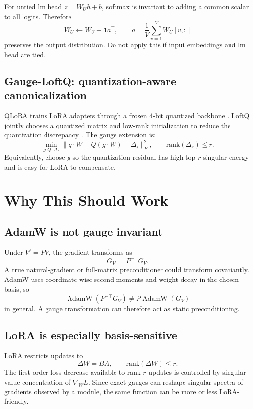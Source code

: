 \documentclass[11pt]{article}
\newcommand{\rank}{\mathrm{rank}}
\begin{document}
For untied lm head $z=W_Uh+b$, softmax is invariant to adding a common scalar to all logits. Therefore
\[
    W_U\leftarrow W_U-\mathbf 1 a^\top,
    \qquad
    a=\frac{1}{V}\sum_{v=1}^V W_U[v,:]
\]
preserves the output distribution. Do not apply this if input embeddings and lm head are tied.

\subsection{Gauge-LoftQ: quantization-aware canonicalization}

QLoRA trains LoRA adapters through a frozen 4-bit quantized backbone \cite{dettmers2023qlora}. LoftQ jointly chooses a quantized matrix and low-rank initialization to reduce the quantization discrepancy \cite{li2023loftq}. The gauge extension is:
\[
    \min_{g,Q,\Delta_r}\|g\cdot W-Q(g\cdot W)-\Delta_r\|_F^2,
    \qquad
    \rank(\Delta_r)\le r.
\]
Equivalently, choose $g$ so the quantization residual has high top-$r$ singular energy and is easy for LoRA to compensate.

\section{Why This Should Work}

\subsection{AdamW is not gauge invariant}

Under $V'=PV$, the gradient transforms as
\[
    G_{V'}=P^{-\top}G_V.
\]
A true natural-gradient or full-matrix preconditioner could transform covariantly. AdamW uses coordinate-wise second moments and weight decay in the chosen basis, so
\[
    \operatorname{AdamW}(P^{-\top}G_V)
    \neq
    P\operatorname{AdamW}(G_V)
\]
in general. A gauge transformation can therefore act as static preconditioning.

\subsection{LoRA is especially basis-sensitive}

LoRA restricts updates to
\[
    \Delta W=BA,
    \qquad
    \rank(\Delta W)\le r.
\]
The first-order loss decrease available to rank-$r$ updates is controlled by singular value concentration of $\nabla_W L$. Since exact gauges can reshape singular spectra of gradients observed by a module, the same function can be more or less LoRA-friendly.
\end{document}
